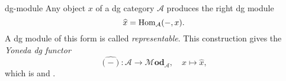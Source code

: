 \begin{example}{dg-module}
    Any object $x$ of a dg category $\mathcal{A}$ produces the right dg module
    \[ \widehat{x} = \operatorname{Hom}_\mathcal{A}(-, x) . \]
    A dg module of this form is called \textit{representable}. This construction gives the \textit{Yoneda dg functor}
    \[ \widehat{(-)} \colon \mathcal{A} \to \mathcal{M}\textbf{od}_\mathcal{A}, \quad x \mapsto \widehat{x} , \]
    which is  and .
\end{example}

